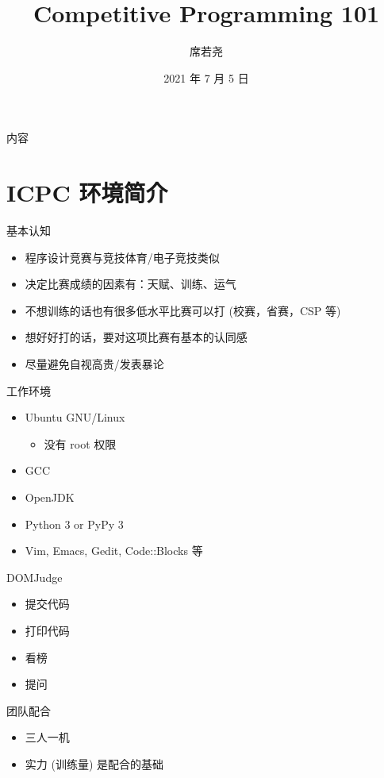 \documentclass[10pt,mathserif]{beamer}
\title{Competitive Programming 101}
\institute{西安电子科技大学程序设计竞赛实训基地}
\author{席若尧}
\date{2021 年 7 月 5 日}
\begin{document}
%
{\xdbg {}}

\begin{frame}{内容}
	\tableofcontents[hideallsubsections]
\end{frame}

\section{ICPC 环境简介}
\sectionpage

\begin{frame}{基本认知}
	\begin{itemize}
		\item 程序设计竞赛与竞技体育/电子竞技类似
		\item 决定比赛成绩的因素有：天赋、训练、运气
		\item 不想训练的话也有很多低水平比赛可以打 (校赛，省赛，CSP 等)
		\item 想好好打的话，要对这项比赛有基本的认同感
		\item 尽量避免自视高贵/发表暴论
	\end{itemize}
\end{frame}

\begin{frame}{工作环境}
	\begin{itemize}
		\item Ubuntu GNU/Linux
			\begin{itemize}
				\item 没有 root 权限
			\end{itemize}
		\item GCC
		\item OpenJDK
		\item Python 3 or PyPy 3
		\item Vim, Emacs, Gedit, Code::Blocks 等
	\end{itemize}
\end{frame}

\begin{frame}{DOMJudge}
	\begin{itemize}
		\item 提交代码
		\item 打印代码
		\item 看榜
		\item 提问
	\end{itemize}
\end{frame}

\begin{frame}{团队配合}
	\begin{itemize}
		\item 三人一机
		\item 实力 (训练量) 是配合的基础
	\end{itemize}
\end{frame}
\end{document}
